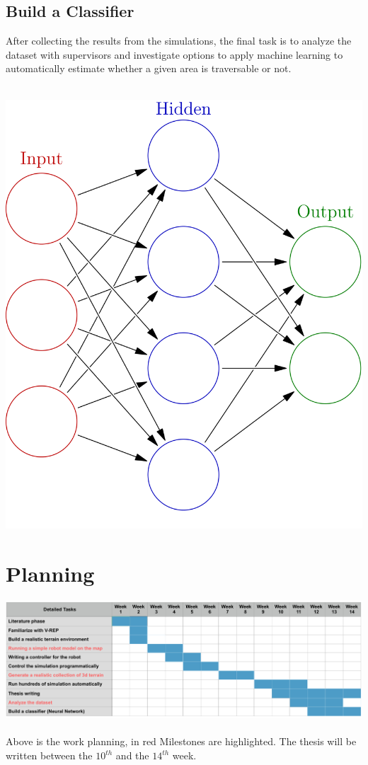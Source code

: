 \documentclass{article}[14pt]
\begin{document}
\subsection*{Build a Classifier}
After collecting the results from the simulations, the final task is to analyze the dataset with supervisors and investigate options to apply machine learning
to automatically estimate whether a given area is traversable or not.\\\\
\begin{center}
    \includegraphics*[scale=0.075]{neuralnetwork.png}
\end{center}
\section*{Planning}
\includegraphics*[width=1.4\textwidth,center]{timetable}\\\\
Above is the work planning, in red Milestones are highlighted. The thesis will be written between the $10^{th}$ and the $14^{th}$ week.
\end{document}

